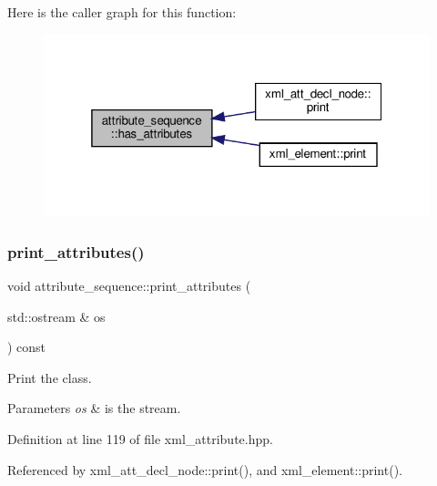 Here is the caller graph for this function\+:
\nopagebreak
\begin{figure}[H]
\begin{center}
\leavevmode
\includegraphics[width=319pt]{de/d33/structattribute__sequence_a48b6174d3fe05633e44b9ae9d37138a4_icgraph}
\end{center}
\end{figure}
\mbox{\label{structattribute__sequence_a451d11624a55b8ea204e640013408538}} 
\subsubsection{\texorpdfstring{print\+\_\+attributes()}{print\_attributes()}}
{\footnotesize\ttfamily void attribute\+\_\+sequence\+::print\+\_\+attributes (\begin{DoxyParamCaption}\item[{std\+::ostream \&}]{os }\end{DoxyParamCaption}) const\hspace{0.3cm}{\ttfamily [inline]}}



Print the class. 


\begin{DoxyParams}{Parameters}
{\em os} & is the stream. \\
\hline
\end{DoxyParams}


Definition at line 119 of file xml\+\_\+attribute.\+hpp.



Referenced by xml\+\_\+att\+\_\+decl\+\_\+node\+::print(), and xml\+\_\+element\+::print().

